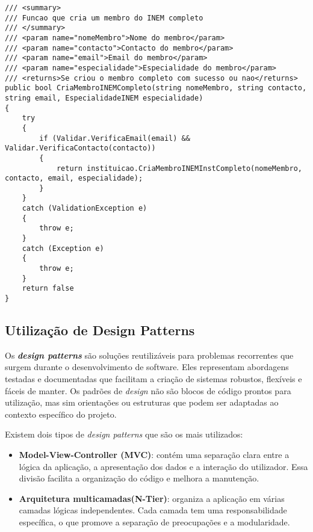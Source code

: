 \documentclass[11pt]{scrartcl} %
\begin{document}
\begin{lstlisting}[language={[Sharp]C}, caption={Exemplo de tratamento de exceções}, label={Tratamento de exceções}]
 /// <summary>
/// Funcao que cria um membro do INEM completo
/// </summary>
/// <param name="nomeMembro">Nome do membro</param>
/// <param name="contacto">Contacto do membro</param>
/// <param name="email">Email do membro</param>
/// <param name="especialidade">Especialidade do membro</param>
/// <returns>Se criou o membro completo com sucesso ou nao</returns>
public bool CriaMembroINEMCompleto(string nomeMembro, string contacto, string email, EspecialidadeINEM especialidade)
{
	try
	{
		if (Validar.VerificaEmail(email) && Validar.VerificaContacto(contacto))
		{
			return instituicao.CriaMembroINEMInstCompleto(nomeMembro, contacto, email, especialidade);
		}
	}
	catch (ValidationException e)
	{
		throw e;
	}
	catch (Exception e)
	{
		throw e;
	}
	return false
}
\end{lstlisting}


\subsection{Utilização de Design Patterns}

Os \textbf{\textit{design patterns}} são soluções reutilizáveis para problemas recorrentes que surgem durante o desenvolvimento de software. Eles representam abordagens testadas e documentadas que facilitam a criação de sistemas robustos, flexíveis e fáceis de manter. Os padrões de \textit{design} não são blocos de código prontos para utilização, mas sim orientações ou estruturas que podem ser adaptadas ao contexto específico do projeto.

Existem dois tipos de \textit{design patterns} que são os mais utilizados:

\begin{itemize}
	\item \textbf{Model-View-Controller (MVC)}: contém uma separação clara entre a lógica da aplicação, a apresentação dos dados e a interação do utilizador. Essa divisão facilita a organização do código e melhora a manutenção.
	\item \textbf{Arquitetura multicamadas(N-Tier)}: organiza a aplicação em várias camadas lógicas independentes. Cada camada tem uma responsabilidade específica, o que promove a separação de preocupações e a modularidade.
\end{itemize}
\end{document}
